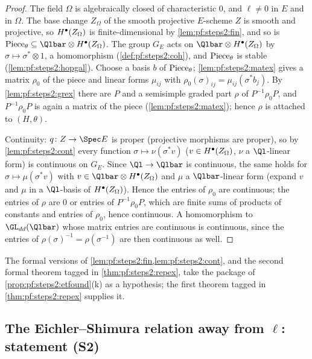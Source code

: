 \begin{proof}
The field $\Omega$ is algebraically closed of characteristic $0$, and $\ell\ne0$ in $E$ and in
$\Omega$. The base change $Z_\Omega$ of the smooth projective $E$-scheme $Z$ is smooth and projective,
so $H^{\bullet}(Z_\Omega)$ is finite-dimensional by \cref{lem:pf:steps2:fin}, and so is
$\stepsiiPiece_\theta\subseteq\Qlbar\otimes\stepsiiH(Z_\Omega)$. The group $G_E$ acts on
$\Qlbar\otimes\stepsiiH(Z_\Omega)$ by $\sigma\mapsto\sigma^\ast\otimes1$, a homomorphism
(\cref{def:pf:steps2:coh}), and $\mathrm{Piece}_\theta$ is stable (\cref{lem:pf:steps2:hopgal}).
Choose a basis $b$ of $\mathrm{Piece}_\theta$; \cref{lem:pf:steps2:matex} gives a matrix $\rho_0$ of
the piece and linear forms $\mu_{ij}$ with $\rho_0(\sigma)_{ij}=\mu_{ij}(\sigma^\ast b_j)$. By
\cref{lem:pf:steps2:grex} there are $P$ and a semisimple graded part $\rho$ of $P^{-1}\rho_0P$, and
$P^{-1}\rho_0P$ is again a matrix of the piece (\cref{lem:pf:steps2:matex}); hence $\rho$ is attached
to $(H,\theta)$.

Continuity: $q\colon Z\to\Spec E$ is proper (projective morphisms are proper), so by
\cref{lem:pf:steps2:cont} every function $\sigma\mapsto\nu(\sigma^\ast v)$ ($v\in H^{\bullet}(Z_\Omega)$,
$\nu$ a $\Ql$-linear form) is continuous on $G_E$. Since $\Ql\to\Qlbar$ is continuous, the same holds
for $\sigma\mapsto\mu(\sigma^\ast v)$ with $v\in\Qlbar\otimes\stepsiiH(Z_\Omega)$ and $\mu$ a
$\Qlbar$-linear form (expand $v$ and $\mu$ in a $\Ql$-basis of $H^{\bullet}(Z_\Omega)$). Hence the
entries of $\rho_0$ are continuous; the entries of $\rho$ are $0$ or entries of $P^{-1}\rho_0P$, which
are finite sums of products of constants and entries of $\rho_0$, hence continuous. A homomorphism to
$\GL_{dd}(\Qlbar)$ whose matrix entries are continuous is continuous, since the entries of
$\rho(\sigma)^{-1}=\rho(\sigma^{-1})$ are then continuous as well.
\end{proof}

\begin{remark}\label{rem:pf:steps2:corehyp}
The formal versions of \cref{lem:pf:steps2:fin,lem:pf:steps2:cont}, and the second formal theorem
tagged in \cref{thm:pf:steps2:repex}, take the package of \cref{prop:pf:steps2:etfound}(k) as a
hypothesis; the first theorem tagged in \cref{thm:pf:steps2:repex} supplies it.
\end{remark}

\subsection{The Eichler--Shimura relation away from \texorpdfstring{$\ell$}{l}: statement (S2)}\label{sec:pf:steps2:es}

